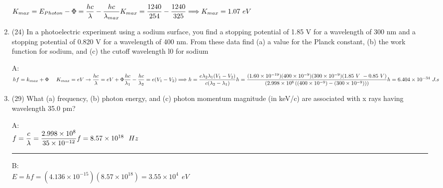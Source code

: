 \documentclass[fleqn]{article}
\begin{document}
\begin{enumerate}
      \textcolor{hwColor}{
        $
          K_{max}=E_{Photon}-\Phi=\dfrac{hc}{\lambda}-\dfrac{hc}{\lambda_{max}} \\
          K_{max}=\dfrac{1240}{254}-\dfrac{1240}{325} \\
          \\
          \Longrightarrow K_{max}=1.07 ~ eV
        $
      }

    \item (24) In a photoelectric experiment using a sodium surface, you
    find a stopping potential of 1.85 V for a wavelength of 300 nm
    and a stopping potential of 0.820 V for a wavelength of 400 nm.
    From these data find (a) a value for the Planck constant, (b) the
    work function for sodium, and (c) the cutoff wavelength l0 for
    sodium

      \textcolor{hwColor}{
        A: \\
        $
          hf=k_{max}+\Phi ~~~~ K_{max}=eV \rightarrow \dfrac{hc}{\lambda}=eV+\Phi \\
          \\
          \dfrac{hc}{\lambda_1}-\dfrac{hc}{\lambda_2}=e(V_1-V_2) \\
          \\
          \Longrightarrow h=\dfrac{e \lambda_2 \lambda_1 (V_1-V_2)}{c(\lambda_2 - \lambda_1)} \\
          \\
          h=\dfrac{(1.60 \times 10^{-19})(400 \times 10^{-9})(300 \times 10^{-9})(1.85~V~-0.85~V )}{(2.998 \times 10^8\left((400 \times 10^{-9})-(300 \times 10^{-9})\right))} \\
          \\
          h=6.404 \times 10^{-34} ~ J.s
        $
      }

    \item (29) What (a) frequency, (b) photon energy, and (c) photon momentum magnitude (in keV/c) are associated with x rays having
    wavelength 35.0 pm?

      \textcolor{hwColor}{
        A: \\
        $
          f=\dfrac{c}{\lambda}=\dfrac{2.998 \times 10^8}{35 \times 10^{-12}} \\
          \\
          f=8.57 \times 10^{18} ~~ Hz
        $
      }

      \textcolor{hwColor}{   
        \rule{15cm}{0.4pt}   
      }

      \textcolor{hwColor}{
        B: \\
        $
          E=hf=(4.136 \times 10^{-15})(8.57 \times 10^{18})=3.55 \times 10^4 ~~ eV
        $
      }


\end{enumerate}
\end{document}
